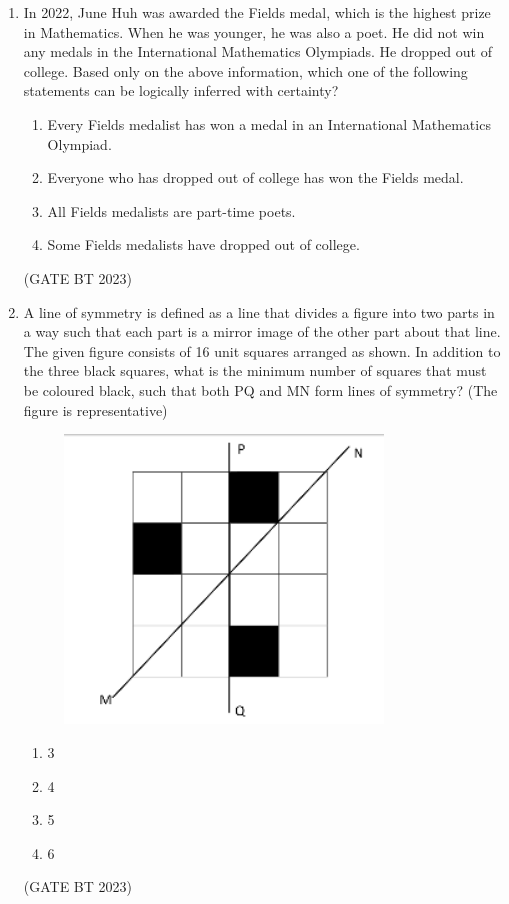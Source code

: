 \documentclass[journal,12pt,onecolumn]{IEEEtran}
\begin{document}
\begin{enumerate}
    \item In 2022, June Huh was awarded the Fields medal, which is the highest prize in Mathematics. When he was younger, he was also a poet. He did not win any medals in the International Mathematics Olympiads. He dropped out of college. Based only on the above information, which one of the following statements can be logically inferred with certainty?
    \begin{enumerate}
        \item Every Fields medalist has won a medal in an International Mathematics Olympiad.
        \item Everyone who has dropped out of college has won the Fields medal.
        \item All Fields medalists are part-time poets.
        \item Some Fields medalists have dropped out of college.
    \end{enumerate}
    \hfill(GATE BT 2023)

    \item A line of symmetry is defined as a line that divides a figure into two parts in a way such that each part is a mirror image of the other part about that line. The given figure consists of 16 unit squares arranged as shown. In addition to the three black squares, what is the minimum number of squares that must be coloured black, such that both PQ and MN form lines of symmetry? (The figure is representative)
    \begin{figure}[H]
        \centering
        \includegraphics[width=0.8\textwidth]{Fig 2.png}
        \caption{}
        \label{fig:question5}
    \end{figure}
    \begin{enumerate}
        \item 3
        \item 4
        \item 5
        \item 6
    \end{enumerate}
    \hfill(GATE BT 2023)


\end{enumerate}
\end{document}
